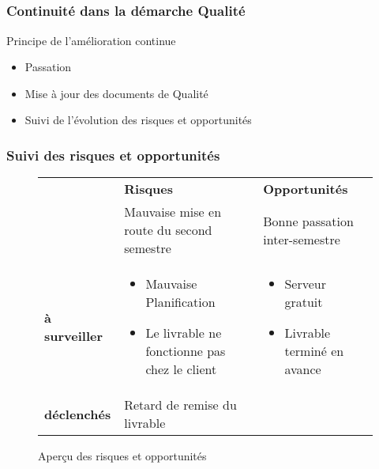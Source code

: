 
\speaker{\Kafui}

\subsection{} %


\begin{frame}
\frametitle{Continuité dans la démarche Qualité}
\begin{block}{Principe de l'amélioration continue}
\begin{itemize}
\item Passation 
\item Mise à jour des documents de Qualité
\item Suivi de l'évolution des risques et opportunités
\end{itemize}
\end{block}
\end{frame}




\begin{frame}
\frametitle{Suivi des risques et opportunités}
\begin{figure}
\begin{longtable}{|p{1.8cm}||p{3.5cm}|p{3.5cm}|}
\hline
 & \textbf{Risques} & \textbf{Opportunités} \\\hhline{|=||=|=|}
\multirow{1}{*}{\textbf{clôturés}} & \small Mauvaise mise en route du second semestre & \small Bonne passation inter-semestre \\\hline
\multirow{1}{*}{\textbf{à surveiller}} & \small \begin{itemize}	
						\item Mauvaise Planification
						\item Le livrable ne fonctionne pas chez le client
						\end{itemize}& \begin{itemize}	
							\item Serveur gratuit
							\item Livrable terminé en avance
							\end{itemize}	\\\hline
\multirow{1}{*}{\textbf{déclenchés}} & \small Retard de remise du livrable & \\\hline
\end{longtable}
\caption{Aperçu des risques et opportunités}
\end{figure}
\end{frame}




